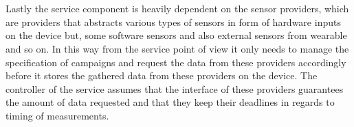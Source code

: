 \\\\
Lastly the service component is heavily dependent on the sensor providers, which are providers that abstracts various types of sensors in form of hardware inputs on the device but, some software sensors and also external sensors from wearable and so on. In this way from the service point of view it only needs to manage the specification of campaigns and request the data from these providers accordingly before it stores the gathered data from these providers on the device. The controller of the service assumes that the interface of these providers guarantees the amount of data requested and that they keep their deadlines in regards to timing of measurements.